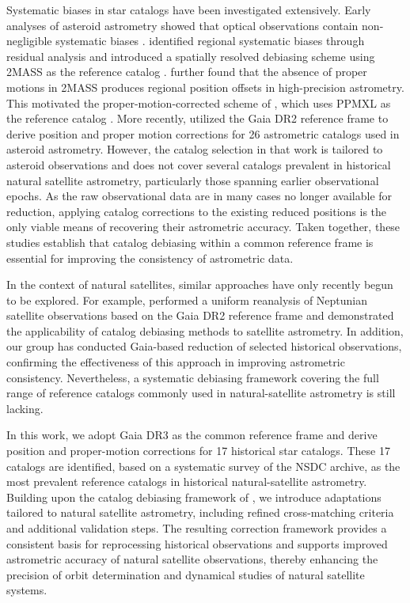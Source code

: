 \documentclass[linenumbers,amsmath,manuscript]{aastex702}
\begin{document}
Systematic biases in star catalogs have been investigated extensively. Early analyses of asteroid astrometry showed that optical observations contain non-negligible systematic biases \citep{Carpino2003}. \citet{Chesley2010} identified regional systematic biases through residual analysis and introduced a spatially resolved debiasing scheme using 2MASS as the reference catalog \citep{Skrutskie2006}. \citet{Tholen2013b} further found that the absence of proper motions in 2MASS produces regional position offsets in high-precision astrometry. This motivated the proper-motion-corrected scheme of \citet{Farnocchia2015}, which uses PPMXL as the reference catalog \citep{Roeser2010}. More recently, \citet{Eggl2020} utilized the Gaia DR2 reference frame to derive position and proper motion corrections for 26 astrometric catalogs used in asteroid astrometry. However, the catalog selection in that work is tailored to asteroid observations and does not cover several catalogs prevalent in historical natural satellite astrometry, particularly those spanning earlier observational epochs. As the raw observational data are in many cases no longer available for reduction, applying catalog corrections to the existing reduced positions is the only viable means of recovering their astrometric accuracy. Taken together, these studies establish that catalog debiasing within a common reference frame is essential for improving the consistency of astrometric data.

In the context of natural satellites, similar approaches have only recently begun to be explored. For example, \citet{Yuan2021} performed a uniform reanalysis of Neptunian satellite observations based on the Gaia DR2 reference frame and demonstrated the applicability of catalog debiasing methods to satellite astrometry. In addition, our group has conducted Gaia-based reduction of selected historical observations, confirming the effectiveness of this approach in improving astrometric consistency. Nevertheless, a systematic debiasing framework covering the full range of reference catalogs commonly used in natural-satellite astrometry is still lacking.

In this work, we adopt Gaia DR3 as the common reference frame and derive position and proper-motion corrections for 17 historical star catalogs. These 17 catalogs are identified, based on a systematic survey of the NSDC archive, as the most prevalent reference catalogs in historical natural-satellite astrometry. Building upon the catalog debiasing framework of \citet{Eggl2020}, we introduce adaptations tailored to natural satellite astrometry, including refined cross-matching criteria and additional validation steps. The resulting correction framework provides a consistent basis for reprocessing historical observations and supports improved astrometric accuracy of natural satellite observations, thereby enhancing the precision of orbit determination and dynamical studies of natural satellite systems.
\end{document}
